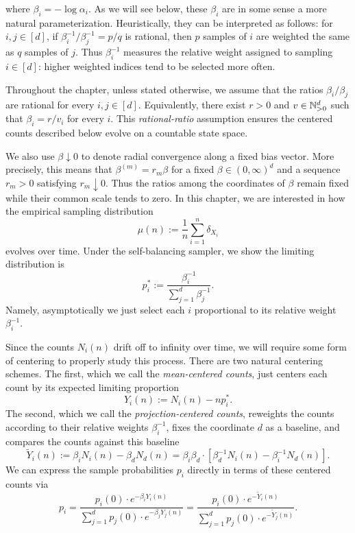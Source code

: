%
\noindent where $\beta_i = - \log \alpha_i$. As we will see below, these $\beta_i$ are in some sense 
a more natural parameterization. Heuristically, they can be interpreted as follows: 
for $i,j \in [d]$, if $\beta_i^{-1} /\beta_j^{-1} = p/q$ is rational, then $p$ samples
 of $i$ are weighted the same as $q$ samples of $j$. Thus $\beta_i^{-1}$ measures the relative weight
assigned to sampling $i \in [d]$: higher weighted indices tend to be selected more often.

Throughout the chapter, unless stated otherwise, we assume that the ratios $\beta_i/\beta_j$ are rational for 
every $i,j\in[d]$. Equivalently, there exist $r>0$ and $v\in\mathbb{N}_{>0}^d$ such that $\beta_i=r/v_i$ for every $i$.
This \emph{rational-ratio} assumption ensures the centered counts described below evolve on a 
countable state space.

We also use $\beta\downarrow0$ to denote radial convergence along a fixed bias vector.
More precisely, this means that $\beta^{(m)}=r_m\beta$ for a fixed $\beta\in(0,\infty)^d$ and 
a sequence $r_m>0$ satisfying $r_m\downarrow 0$. Thus the ratios among the coordinates of $\beta$ remain 
fixed while their common scale tends to zero. In this chapter, we are interested in how the empirical sampling distribution
%
\[\mu(n) := \frac{1}{n} \sum_{i=1}^n \delta_{X_i}\]
%
\noindent evolves over time. Under the self-balancing sampler, we show the limiting distribution is
%
\[p_i^* := \frac{\beta_i^{-1}}{\sum_{j=1}^d \beta_j^{-1}}.\]
%
\noindent Namely, asymptotically we just select each $i$ proportional to its relative weight $\beta_i^{-1}.$

Since the counts $N_i(n)$ drift off to infinity over time, we will require some form of centering to properly study this process. There are two natural centering schemes. The first, which we call the \textit{mean-centered counts}, just centers each count by its expected limiting proportion
\[Y_i(n) := N_i(n) - n p_i^*.\]
%
The second, which we call the \textit{projection-centered counts}, reweights the counts according to their relative weights $\beta_i^{-1}$, fixes the coordinate $d$ as a baseline, and compares the counts against this baseline
%
\[\widetilde{Y}_i(n) := \beta_iN_i(n) - \beta_d N_d(n) = \beta_i\beta_d \cdot  [\beta_d^{-1} N_i(n) - \beta_i^{-1} N_d(n)].\]
%
\noindent We can express the sample probabilities $p_i$ directly in terms of these centered counts via
%
\[p_i = \frac{p_{i}(0) \cdot e^{- \beta_i Y_{i}(n)}}{\sum_{j=1}^d p_{j}(0) \cdot e^{- \beta_j Y_{j}(n) }}= \frac{p_{i}(0) \cdot e^{- \widetilde{Y}_{i}(n)}}{\sum_{j=1}^d p_{j}(0) \cdot e^{-\widetilde{Y}_{j}(n) }}.\]
%

